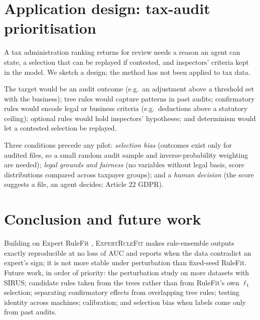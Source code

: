 \documentclass[11pt,a4paper]{article}
\theoremstyle{definition}\newtheorem{definition}{Definition}
\begin{document}
\section{Application design: tax-audit prioritisation}\label{sec:app}

A tax administration ranking returns for review needs a reason an agent can state, a selection that can be replayed if contested, and inspectors' criteria kept in the model. We sketch a design; the method has not been applied to tax data.

The target would be an audit outcome (e.g.\ an adjustment above a threshold set with the business); tree rules would capture patterns in past audits; confirmatory rules would encode legal or business criteria (e.g.\ deductions above a statutory ceiling); optional rules would hold inspectors' hypotheses; and determinism would let a contested selection be replayed.

Three conditions precede any pilot: \emph{selection bias} (outcomes exist only for audited files, so a small random audit sample and inverse-probability weighting are needed); \emph{legal grounds and fairness} (no variables without legal basis, score distributions compared across taxpayer groups); and a \emph{human decision} (the score suggests a file, an agent decides; Article 22 GDPR). 

\section{Conclusion and future work}

Building on Expert RuleFit \citep{ebner_erf}, \textsc{ExpertRuleFit} makes rule-ensemble outputs exactly reproducible at no loss of AUC and reports when the data contradict an expert's sign; it is not more stable under perturbation than fixed-seed RuleFit. Future work, in order of priority: the perturbation study on more datasets with SIRUS; candidate rules taken from the trees rather than from RuleFit's own $\ell_1$ selection; separating confirmatory effects from overlapping tree rules; testing identity across machines; calibration; and selection bias when labels come only from past audits.
\end{document}
